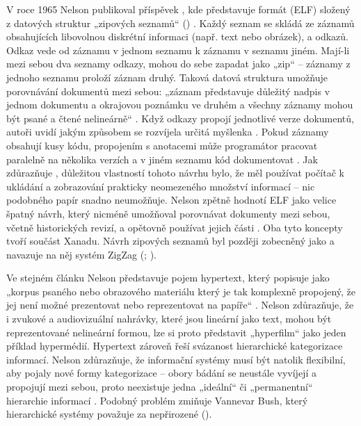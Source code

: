 V roce 1965 Nelson publikoval příspěvek , kde představuje formát  (ELF) složený z datových struktur „zipových seznamů“ () \autocite[89]{Nelson1965}. Každý seznam se skládá ze záznamů obsahujících libovolnou diskrétní informaci (např. text nebo obrázek), a odkazů. Odkaz vede od záznamu v jednom seznamu k záznamu v seznamu jiném. Mají-li mezi sebou dva seznamy odkazy, mohou do sebe zapadat jako „zip“ \autocite[90]{Nelson1965} -- záznamy z jednoho seznamu proloží záznam druhý. Taková datová struktura umožňuje porovnávání dokumentů mezi sebou: „záznam představuje důležitý nadpis v jednom dokumentu a okrajovou poznámku ve druhém a všechny záznamy mohou být psané a čtené nelineárně“ \autocite[72]{Barnet2014}. Když odkazy propojí jednotlivé verze dokumentů, autoři uvidí jakým způsobem se rozvíjela určitá myšlenka \autocite[72]{Barnet2014}.
Pokud záznamy obsahují kusy kódu, propojením s anotacemi může programátor pracovat paralelně na několika verzích a v jiném seznamu kód dokumentovat \autocite[93--94]{Nelson1965}. Jak zdůrazňuje \textcite[72]{Barnet2014}, důležitou vlastností tohoto návrhu bylo, že měl používat počítač k ukládání a zobrazování prakticky neomezeného množství informací -- nic podobného papír snadno neumožňuje. Nelson zpětně hodnotí ELF jako velice špatný návrh,
který nicméně umožňoval porovnávat dokumenty mezi sebou, včetně historických revizí, a opětovně používat jejich části \autocites[151]{Possiplex}[72]{Barnet2014}. Oba tyto koncepty tvoří součást Xanadu. Návrh zipových seznamů byl později zobecněný jako  \autocite[DM52]{Nelson1974} a navazuje na něj systém ZigZag (\cite[72]{Barnet2014}; ).

Ve stejném článku Nelson představuje pojem hypertext, který popisuje jako „korpus psaného nebo obrazového materiálu který je tak komplexně propojený, že jej není možné prezentovat nebo reprezentovat na papíře“ \autocite[96]{Nelson1965}. Nelson zdůrazňuje, že i zvukové a audiovizuální nahrávky, které jsou lineární jako text, mohou být reprezentované nelineární formou, lze si proto představit „hyperfilm“ jako jeden příklad hypermédií. Hypertext zároveň řeší svázanost hierarchické kategorizace informací. Nelson zdůrazňuje, že informační systémy musí být natolik flexibilní, aby pojaly nové formy kategorizace -- obory bádání se neustále vyvíjejí a propojují mezi sebou, proto neexistuje jedna „ideální“ či „permanentní“ hierarchie informací \autocite[97]{Nelson1965}. Podobný problém zmiňuje Vannevar Bush, který hierarchické systémy považuje za nepřirozené ().

